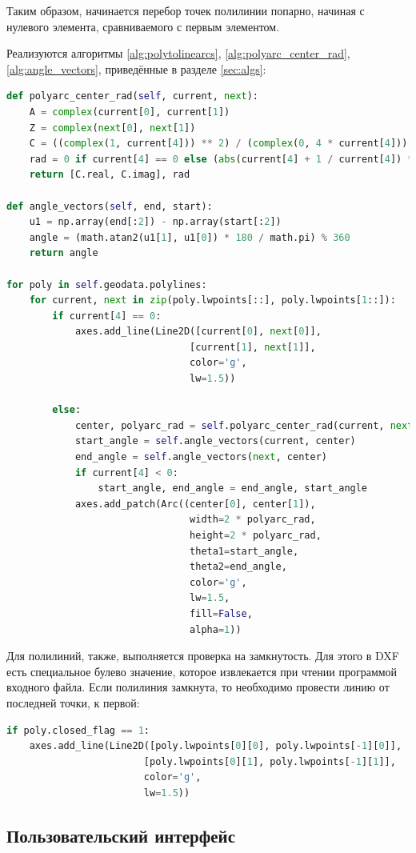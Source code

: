 Таким образом, начинается перебор точек полилинии попарно, начиная с нулевого элемента, сравниваемого с первым элементом.

Реализуются алгоритмы \ref{alg:polytolinearcs}, \ref{alg:polyarc_center_rad}, \ref{alg:angle_vectors}, приведённые в разделе \ref{sec:algs}:
\begin{lstlisting}[language=python,label=list:sketch]
def polyarc_center_rad(self, current, next):
	A = complex(current[0], current[1])
	Z = complex(next[0], next[1])
	C = ((complex(1, current[4])) ** 2) / (complex(0, 4 * current[4])) * A - ((complex(1, -current[4])) ** 2) / (complex(0, 4 * current[4])) * Z
	rad = 0 if current[4] == 0 else (abs(current[4] + 1 / current[4]) * math.sqrt((next[0] - current[0]) ** 2 + (next[1] - current[1]) ** 2) / 4)
	return [C.real, C.imag], rad

def angle_vectors(self, end, start):
	u1 = np.array(end[:2]) - np.array(start[:2])
	angle = (math.atan2(u1[1], u1[0]) * 180 / math.pi) % 360
	return angle

for poly in self.geodata.polylines:
	for current, next in zip(poly.lwpoints[::], poly.lwpoints[1::]):
		if current[4] == 0:
			axes.add_line(Line2D([current[0], next[0]],
								[current[1], next[1]],
								color='g',
								lw=1.5))

		else:
			center, polyarc_rad = self.polyarc_center_rad(current, next)
			start_angle = self.angle_vectors(current, center)
			end_angle = self.angle_vectors(next, center)
			if current[4] < 0:
				start_angle, end_angle = end_angle, start_angle
			axes.add_patch(Arc((center[0], center[1]),
								width=2 * polyarc_rad,
								height=2 * polyarc_rad,
								theta1=start_angle,
								theta2=end_angle,
								color='g',
								lw=1.5,
								fill=False,
								alpha=1))
\end{lstlisting}

Для полилиний, также, выполняется проверка на замкнутость.  Для этого в DXF есть специальное булево значение, которое извлекается при чтении программой входного файла. Если полилиния замкнута, то необходимо провести линию от последней точки, к первой:
\begin{lstlisting}[language=python,label=list:closedflag]
if poly.closed_flag == 1:
	axes.add_line(Line2D([poly.lwpoints[0][0], poly.lwpoints[-1][0]],
						[poly.lwpoints[0][1], poly.lwpoints[-1][1]],
						color='g',
						lw=1.5))
\end{lstlisting}

\subsection{Пользовательский интерфейс}


